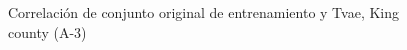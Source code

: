 \begin{figure}[H]
    \centering
    
    \caption{Correlación de conjunto original de entrenamiento y Tvae, King county (A-3)}
    \label{pairwise-king county-a-3-tvae}
\end{figure}